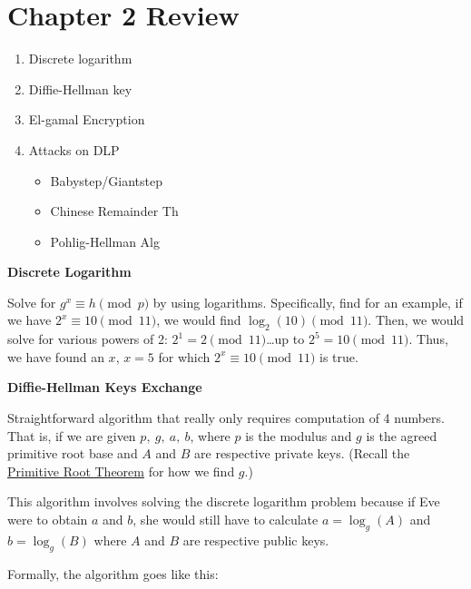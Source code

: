 \setcounter{chapter}{99}
\setcounter{ExampleCounter}{50}


\section*{Chapter 2 Review}

\begin{enumerate}
    \item Discrete logarithm
    \item Diffie-Hellman key
    \item El-gamal Encryption
    \item Attacks on DLP
          \begin{itemize}
              \item Babystep/Giantstep
              \item Chinese Remainder Th
              \item Pohlig-Hellman Alg
          \end{itemize}
\end{enumerate}

\begin{center}
    \textbf{Discrete Logarithm}
\end{center}

Solve for \(g^x \equiv h \pmod{p}\) by using logarithms. Specifically, find for an example, if we have \(2^x \equiv 10 \pmod{11}\), we would find \(\log_2(10) \pmod{11}\). Then, we would solve for various powers of 2: \(2^1 = 2 \pmod{11}\)\dots up to \(2^5 = 10 \pmod{11}\). Thus, we have found an \(x\), \(x = 5\) for which \(2^x \equiv 10 \pmod{11}\) is true.


\begin{center}
    \textbf{Diffie-Hellman Keys Exchange}
\end{center}

Straightforward algorithm that really only requires computation of 4 numbers. That is, if we are given \(p, \ g, \ a, \ b\), where \(p\) is the modulus and \(g\) is the agreed primitive root base and \(A\) and \(B\) are respective private keys. (Recall the \hyperlink{thm:Primitive Root Theorem}{Primitive Root Theorem} for how we find \(g\).)

This algorithm involves solving the discrete logarithm problem because if Eve were to obtain \(a\) and \(b\), she would still have to calculate \(a = \log_g(A)\) and \(b = \log_g(B)\) where \(A\) and \(B\) are respective public keys.

Formally, the algorithm goes like this:

